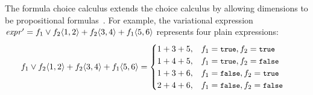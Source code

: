 %
\noindent
The formula
choice calculus extends the choice calculus 
by allowing dimensions to be propositional formulas~\cite{HW16fosd}. For example,
the variational expression $\VVal {\mathit{expr}} = \chc [\A \vee \B] {1,2} + \chc [\B] {3,4} + \chc [\A] {5,6}$ represents
four plain expressions: 
\begin{alignat*}{1}
\chc [\A \vee \B] {1,2} + \chc [\B] {3,4} + \chc [\A] {5,6}&=
\begin{cases}
  1+3+5,& \A =\t, \B = \t\\
  1+4+5,& \A =\t, \B = \f\\
  1+3+6,& \A =\f, \B = \t\\
  2+4+6,& \A =\f, \B = \f
\end{cases}
\end{alignat*}


